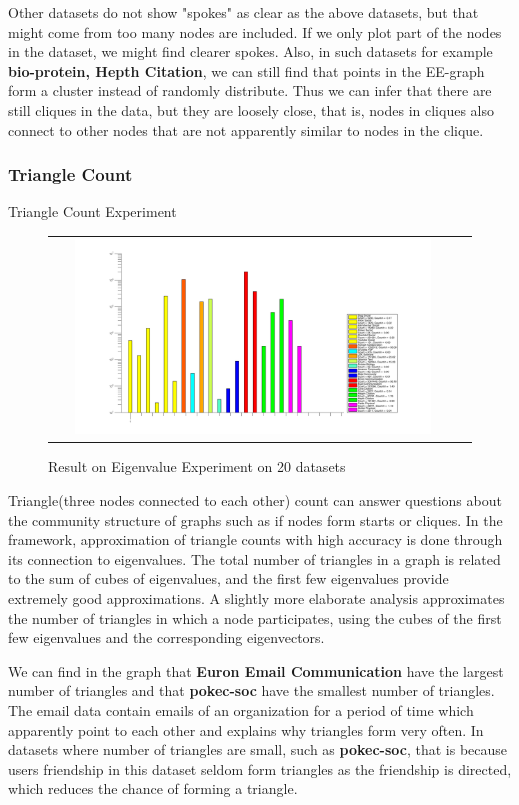 Other datasets do not show "spokes" as clear as the above datasets, but that might come from too many nodes are included. If we only plot part of the nodes in the dataset, we might find clearer spokes. Also, in such datasets for example \textbf{bio-protein, Hepth Citation}, we can still find that points in the EE-graph form a cluster instead of randomly distribute. Thus we can infer that there are still cliques in the data, but they are loosely close, that is, nodes in cliques also connect to other nodes that are not apparently similar to nodes in the clique.

\subsubsection{Triangle Count}
Triangle Count Experiment

\begin{figure}[H]
\begin{center}
\begin{tabular}{cc}
     \includegraphics[width=0.9\textwidth]{FIG/trianglecount.png}
\end{tabular}
\caption{Result on Eigenvalue Experiment on 20 datasets}
\end{center}
\end{figure}

Triangle(three nodes connected to each other) count can answer questions about the community structure of graphs such as if nodes form starts or cliques. In the framework, approximation of triangle counts with high accuracy is done through its connection to eigenvalues. The total number of triangles in a graph is related to the sum of cubes of eigenvalues, and the first few eigenvalues provide extremely good approximations. A slightly more elaborate analysis approximates the number of triangles in which a node participates, using the cubes of the first few eigenvalues and the corresponding eigenvectors.

We can find in the graph that \textbf{Euron Email Communication} have the largest number of triangles and that \textbf{pokec-soc} have the smallest number of triangles. The email data contain emails of an organization for a period of time which apparently point to each other and explains why triangles form very often. In datasets where number of triangles are small, such as \textbf{pokec-soc}, that is because users friendship in this dataset seldom form triangles as the friendship is directed, which reduces the chance of forming a triangle.



